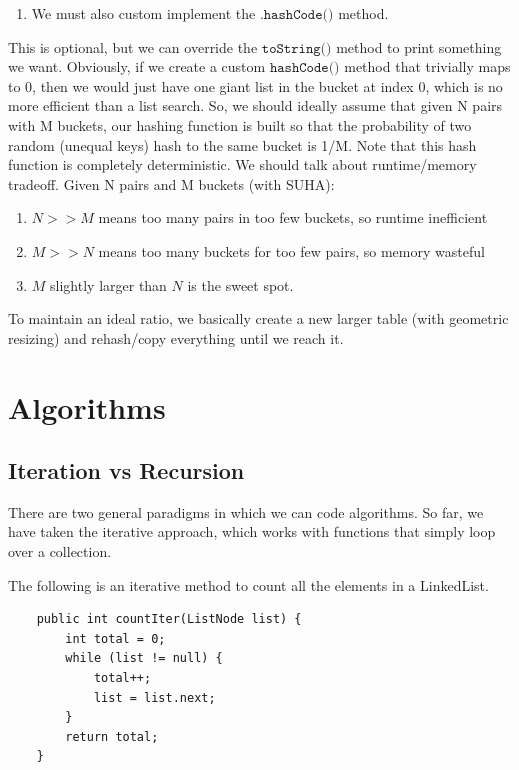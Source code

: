 \documentclass{article}
\begin{document}
\begin{definition}
\begin{enumerate}
        \item We must also custom implement the $\texttt{.hashCode()}$ method.
    \end{enumerate}
    This is optional, but we can override the $\texttt{toString()}$ method to print something we want. Obviously, if we create a custom $\texttt{hashCode()}$ method that trivially maps to 0, then we would just have one giant list in the bucket at index 0, which is no more efficient than a list search. So, we should ideally assume that given N pairs with M buckets, our hashing function is built so that the probability of two random (unequal keys) hash to the same bucket is 1/M. Note that this hash function is completely deterministic. We should talk about runtime/memory tradeoff. Given N pairs and M buckets (with SUHA): 
    \begin{enumerate}
        \item $N >> M$ means too many pairs in too few buckets, so runtime inefficient 
        \item $M >> N$ means too many buckets for too few pairs, so memory wasteful 
        \item $M$ slightly larger than $N$ is the sweet spot.
    \end{enumerate}
    To maintain an ideal ratio, we basically create a new larger table (with geometric resizing) and rehash/copy everything until we reach it.
    \end{definition}

\section{Algorithms}

  \subsection{Iteration vs Recursion}

    There are two general paradigms in which we can code algorithms. So far, we have taken the iterative approach, which works with functions that simply loop over a collection. 

    \begin{example}[Iteration]
    The following is an iterative method to count all the elements in a LinkedList. 
    \begin{lstlisting}
    public int countIter(ListNode list) {
        int total = 0; 
        while (list != null) {
            total++; 
            list = list.next; 
        }
        return total; 
    }
    \end{lstlisting}
    \end{example}
\end{document}
